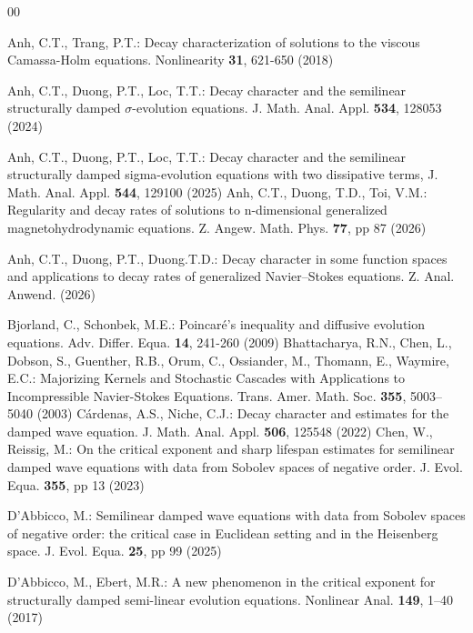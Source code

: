 \documentclass[11pt,reqno]{amsart}
\begin{document}
\begin{thebibliography}{00}
 
 Anh, C.T., Trang, P.T.: Decay characterization of solutions to the viscous Camassa-Holm equations. Nonlinearity \textbf{31}, 621-650 (2018)

 Anh, C.T., Duong, P.T., Loc, T.T.: Decay character and the semilinear structurally damped $\sigma$-evolution equations. J. Math. Anal. Appl. {\bf534}, 128053 (2024)

 Anh, C.T., Duong, P.T., Loc, T.T.: Decay character and the semilinear structurally damped sigma-evolution equations with two dissipative terms, J. Math. Anal. Appl. {\bf544}, 129100 (2025)
 Anh, C.T., Duong, T.D., Toi, V.M.: Regularity and decay rates of solutions to n-dimensional generalized magnetohydrodynamic equations. Z. Angew. Math. Phys. \textbf{77}, pp 87 (2026)

 Anh, C.T., Duong, P.T., Duong.T.D.: Decay character in some function spaces and applications to decay rates of generalized Navier–Stokes equations. Z. Anal. Anwend. (2026)

 Bjorland, C., Schonbek, M.E.: Poincar\'e's inequality and diffusive evolution equations. Adv. Differ. Equa. \textbf{14}, 241-260 (2009)
 Bhattacharya, R.N., Chen, L., Dobson, S., Guenther, R.B., Orum, C., Ossiander, M., Thomann, E., Waymire, E.C.: Majorizing Kernels and Stochastic Cascades with Applications to Incompressible Navier-Stokes Equations. Trans.  Amer. Math. Soc. \textbf{355}, 5003--5040 (2003)
 C\'ardenas, A.S., Niche, C.J.: Decay character and estimates for the damped wave equation. J. Math. Anal. Appl. {\bf506}, 125548 (2022)
 Chen,  W., Reissig, M.:  On the critical exponent and sharp lifespan estimates for semilinear damped wave equations with data from Sobolev spaces of negative order. J. Evol. Equa. \textbf{355}, pp 13 (2023)

   D'Abbicco, M.: Semilinear damped wave equations with data from Sobolev spaces of negative order: the critical case in Euclidean setting and in the Heisenberg space. J. Evol. Equa.  \textbf{25}, pp 99 (2025)

 D'Abbicco, M., Ebert, M.R.: A new phenomenon in the critical exponent for structurally damped semi-linear evolution equations. Nonlinear Anal. \textbf{149}, 1--40 (2017)


\end{thebibliography}
\end{document}
